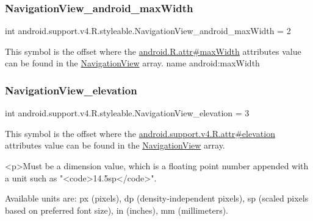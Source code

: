 \subsubsection{\texorpdfstring{Navigation\+View\+\_\+android\+\_\+max\+Width}{NavigationView\_android\_maxWidth}}
{\footnotesize\ttfamily int android.\+support.\+v4.\+R.\+styleable.\+Navigation\+View\+\_\+android\+\_\+max\+Width = 2\hspace{0.3cm}{\ttfamily [static]}}

This symbol is the offset where the \hyperlink{}{android.\+R.\+attr\#max\+Width} attribute\textquotesingle{}s value can be found in the \hyperlink{classandroid_1_1support_1_1v4_1_1R_1_1styleable_a6e99b86cbaa0c61ca7598c15df537789}{Navigation\+View} array.  name android\+:max\+Width \mbox{\label{classandroid_1_1support_1_1v4_1_1R_1_1styleable_ac60a6df259fa99f7015ffb729a6e9f61}} 
\subsubsection{\texorpdfstring{Navigation\+View\+\_\+elevation}{NavigationView\_elevation}}
{\footnotesize\ttfamily int android.\+support.\+v4.\+R.\+styleable.\+Navigation\+View\+\_\+elevation = 3\hspace{0.3cm}{\ttfamily [static]}}

This symbol is the offset where the \hyperlink{classandroid_1_1support_1_1v4_1_1R_1_1attr_a5906f91b859c693a38a88ad3b0be4a39}{android.\+support.\+v4.\+R.\+attr\#elevation} attribute\textquotesingle{}s value can be found in the \hyperlink{classandroid_1_1support_1_1v4_1_1R_1_1styleable_a6e99b86cbaa0c61ca7598c15df537789}{Navigation\+View} array.

\begin{DoxyVerb}      <p>Must be a dimension value, which is a floating point number appended with a unit such as "<code>14.5sp</code>".
\end{DoxyVerb}
 Available units are\+: px (pixels), dp (density-\/independent pixels), sp (scaled pixels based on preferred font size), in (inches), mm (millimeters). 

